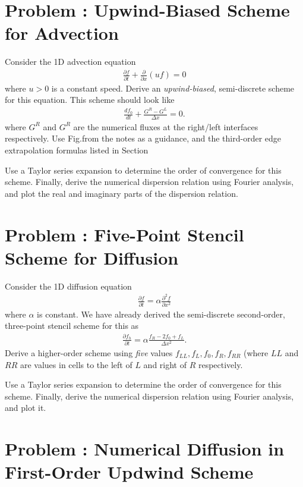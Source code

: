 \documentclass[12pt]{article}
\theoremstyle{definition}
\theoremstyle{definition}
\theoremstyle{definition}
\newcommand{\pfrac}[2]{\frac{\partial #1}{\partial #2}}
\newcommand{\pfracc}[2]{\frac{\partial^2 #1}{\partial #2^2}}
\newcommand{\pfraca}[1]{\frac{\partial}{\partial #1}}
\newcounter{probnum}
\begin{document}
\section*{Problem : Upwind-Biased Scheme for Advection}

Consider the 1D advection equation
\begin{align}
\pfrac{f}{t} + \pfraca{x}(u f) = 0  
\end{align}
where $u > 0$ is a constant speed. Derive an \emph{upwind-biased}, 
semi-discrete scheme for this equation. This scheme should look like
\begin{align}
  \frac{df_0}{dt}
  +
  \frac{G^R - G^L}{\Delta x}
  =
  0.
\end{align}
where $G^R$ and $G^R$ are the numerical fluxes at the right/left
interfaces respectively. Use Fig.\thinspace[4] from the notes as a
guidance, and the third-order edge extrapolation formulas listed in
Section

Use a Taylor series expansion to determine the order of convergence
for this scheme. Finally, derive the numerical dispersion relation
using Fourier analysis, and plot the real and imaginary parts of the
dispersion relation.

\section*{Problem : Five-Point Stencil Scheme for
  Diffusion}

Consider the 1D diffusion equation
\begin{align}
\pfrac{f}{t} = \alpha \pfracc{f}{x}
\end{align}
where $\alpha$ is constant. We have already derived the semi-discrete
second-order, three-point stencil scheme for this as
\begin{align}
  \pfrac{f_h}{t} = \alpha \frac{f_R - 2 f_0 + f_L}{\Delta x^2}.
\end{align}
Derive a higher-order scheme using \emph{five} values
$f_{LL}, f_{L}, f_{0}, f_{R}, f_{RR}$ (where $LL$ and $RR$ are values
in cells to the left of $L$ and right of $R$ respectively.

Use a Taylor series expansion to determine the order of convergence
for this scheme. Finally, derive the numerical dispersion relation
using Fourier analysis, and plot it.

\section*{Problem : Numerical Diffusion in First-Order
  Updwind Scheme}
\end{document}
